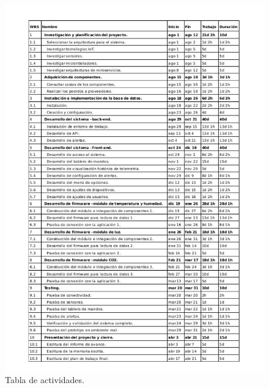 \documentclass[
11pt, %
]{charter}
\begin{document}
\begin{figure}[htpb]
\centering 
\includegraphics[width=.50\textheight]{./Figuras/Tareas.png}
\caption{Tabla de actividades.}
\label{fig:AoN}
\end{figure}

\end{document}

